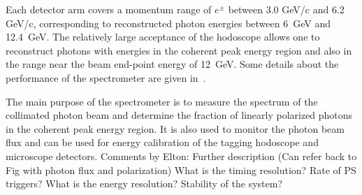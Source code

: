 Each detector arm covers a momentum range of $e^\pm$ between 3.0 GeV/c and 6.2 GeV/c, 
corresponding to reconstructed photon energies between 6~GeV and 12.4~GeV. The relatively
large acceptance of the hodoscope allows one to reconstruct photons
with energies in the coherent peak energy region and also in the range
near the beam end-point energy of 12~GeV. Some details about the performance of the spectrometer are given in~\cite{Somov:2017vhp,Somov:2016bgb}.

The main purpose of the spectrometer is to measure the spectrum of the
collimated photon beam and determine the fraction of linearly polarized
photons in the coherent peak energy region.
It is also used to monitor the photon beam flux and can be used for 
energy calibration of the tagging hodoscope and microscope detectors.
{\color{red} Comments by Elton: Further description (Can refer back to Fig with photon flux and polarization) What is the timing resolution? Rate of PS triggers? What is the energy resolution? Stability of the system?}




